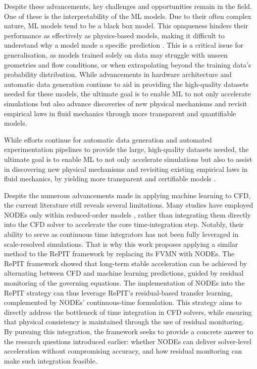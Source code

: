 Despite these advancements, key challenges and opportunities remain in the field. One of these is the interpretability of the ML models. Due to their often complex nature, ML models tend to be a black box model. This opaqueness hinders their performance as effectively as physics-based models, making it difficult to understand why a model made a specific prediction \cite{Vinuesa2022, Girimaji2024}. This is a critical issue for generalisation, as models trained solely on data may struggle with unseen geometries and flow conditions, or when extrapolating beyond the training data's probability distribution. While advancements in hardware architecture \cite{ansys2023multiGPU, Chen2009} and automatic data generation continue to aid in providing the high-quality datasets needed for these models, the ultimate goal is to enable ML to not only accelerate simulations but also advance discoveries of new physical mechanisms and revisit empirical laws in fluid mechanics through more transparent and quantifiable models. 

While efforts continue for automatic data generation and automated experimentation pipelines to provide the large, high-quality datasets needed, the ultimate goal is to enable ML to not only accelerate simulations but also to assist in discovering new physical mechanisms and revisiting existing empirical laws in fluid mechanics, by yielding more transparent and certifiable models \cite{Brunton2020, Vinuesa2022}.

Despite the numerous advancements made in applying machine learning to CFD, the current literature still reveals several limitations. Many studies have employed NODEs only within reduced-order models \cite{Rojas2021, Shankar2022}, rather than integrating them directly into the CFD solver to accelerate the core time-integration step. Notably, their ability to serve as continuous time integrators has not been fully leveraged in scale-resolved simulations. That is why this work proposes applying a similar method to the RePIT framework by replacing its FVMN with NODEs. The RePIT framework showed that long-term stable acceleration can be achieved by alternating between CFD and machine learning predictions, guided by residual monitoring of the governing equations. The implementation of NODEs into the RePIT strategy can thus leverage RePIT’s residual-based transfer learning, complemented by NODEs’ continuous-time formulation. This strategy aims to directly address the bottleneck of time integration in CFD solvers, while ensuring that physical consistency is maintained through the use of residual monitoring. By pursuing this integration, the framework seeks to provide a concrete answer to the research questions introduced earlier: whether NODEs can deliver solver-level acceleration without compromising accuracy, and how residual monitoring can make such integration feasible.

